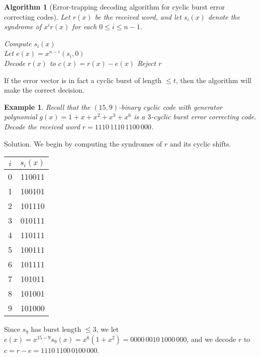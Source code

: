 \documentclass[10pt]{article}
\theoremstyle{newstyle}
\newtheorem{exmp}[thm]{Example}
\newtheorem{algo}[thm]{Algorithm}
\begin{document}
\begin{algo}[Error-trapping decoding algorithm for cyclic burst error correcting codes]
Let $r(x)$ be the received word, and let $s_i(x)$ denote the syndrome of 
$x^ir(x)$ for each $0 \leq i \leq n-1$. 

\begin{algorithm}[H]
\begin{algorithmic}[1]
\STATE Compute $s_i(x)$ \\
\STATE Let $e(x) = x^{n-i}(s_i, 0)$ \\
\STATE Decode $r(x)$ to $c(x) = r(x) - e(x)$
\ENDIF
\ENDFOR
\STATE Reject $r$
\end{algorithmic}
\end{algorithm}
\end{algo}

If the error vector is in fact a cyclic burst of length $\leq t$, then the algorithm will 
make the correct decision. 

\begin{exmp}
Recall that the $(15, 9)$-binary cyclic code with generator polynomial $g(x) 
= 1+x+x^2+x^3+x^6$ is a $3$-cyclic burst error correcting code. Decode the received word 
$r = 1110\,1110\,1100\,000$. 
\end{exmp}

{\sc Solution.} We begin by computing the syndromes of $r$ and its cyclic shifts. 

\begin{table}[H]
\centering
\begin{tabular}{c|c}
$i$ & $s_i(x)$ \\ \hline
0   & 110011   \\
1   & 100101   \\
2   & 101110   \\
3   & 010111   \\
4   & 110111   \\
5   & 100111   \\
6   & 101111   \\
7   & 101011   \\
8   & 101001   \\
9   & 101000  
\end{tabular}
\end{table}

Since $s_9$ has burst length $\leq 3$, we let $e(x) = x^{15-9} s_9(x) = 
x^6(1+x^2) = 0000\,0010\,1000\,000$, and we decode $r$ to 
$c = r- e = 1110\,1100\,0100\,000$. 
\end{document}
